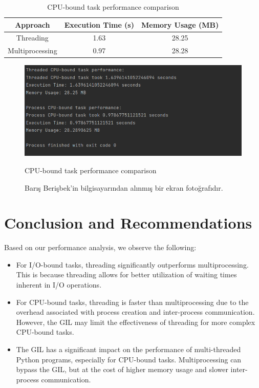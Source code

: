 \documentclass[onecolumn]{article}
\begin{document}
\begin{table}[h!]
\centering
\begin{tabular}{|c|c|c|}
\hline
\textbf{Approach} & \textbf{Execution Time (s)} & \textbf{Memory Usage (MB)} \\
\hline
Threading & 1.63 & 28.25 \\
\hline
Multiprocessing & 0.97 & 28.28 \\
\hline
\end{tabular}
\caption{CPU-bound task performance comparison}
\end{table}
\begin{figure}[ht!]
    \centering
    \includegraphics[width=1\textwidth]{pictures/cpubound.png}
    \caption{CPU-bound task performance comparison}
    \caption{Barış Berişbek'in bilgisayarından alınmış bir ekran fotoğrafıdır.}
\end{figure}


\section{Conclusion and Recommendations}
Based on our performance analysis, we observe the following:

\begin{itemize}
    \item For I/O-bound tasks, threading significantly outperforms multiprocessing. This is because threading allows for better utilization of waiting times inherent in I/O operations.
    \item For CPU-bound tasks, threading is faster than multiprocessing due to the overhead associated with process creation and inter-process communication. However, the GIL may limit the effectiveness of threading for more complex CPU-bound tasks.
    \item The GIL has a significant impact on the performance of multi-threaded Python programs, especially for CPU-bound tasks. Multiprocessing can bypass the GIL, but at the cost of higher memory usage and slower inter-process communication.
\end{itemize}
\end{document}
